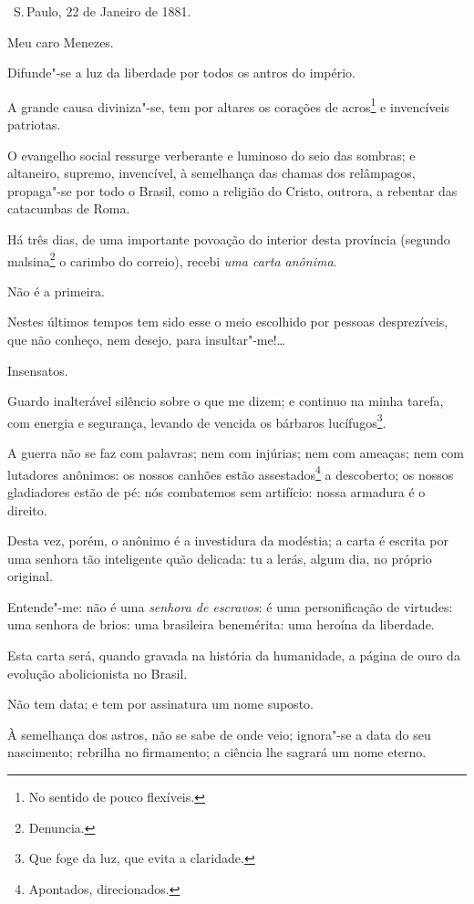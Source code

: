 \hfill\ S.\,Paulo, 22 de Janeiro de 1881.\bigskip

\noindent{}Meu caro Menezes.\smallskip

Difunde"-se a luz da liberdade por todos os antros do império.

A grande causa diviniza"-se, tem por altares os corações de
acros\footnote{No sentido de pouco flexíveis.} e invencíveis
patriotas.

O evangelho social ressurge verberante e luminoso do seio das sombras; e
altaneiro, supremo, invencível, à semelhança das chamas dos relâmpagos,
propaga"-se por todo o Brasil, como a religião do Cristo, outrora, a
rebentar das catacumbas de Roma.

Há três dias, de uma importante povoação do interior desta província
(segundo malsina\footnote{Denuncia.} o carimbo do correio), recebi
\emph{uma carta anônima}.

Não é a primeira.

Nestes últimos tempos tem sido esse o meio escolhido por pessoas
desprezíveis, que não conheço, nem desejo, para insultar"-me!\ldots{}

Insensatos.

Guardo inalterável silêncio sobre o que me dizem; e continuo na minha
tarefa, com energia e segurança, levando de vencida os bárbaros
lucífugos\footnote{Que foge da luz, que evita a claridade.}.

A guerra não se faz com palavras; nem com injúrias; nem com ameaças; nem
com lutadores anônimos: os nossos canhões estão assestados\footnote{
  Apontados, direcionados.} a descoberto; os nossos gladiadores estão de
pé: nós combatemos sem artifício: nossa armadura é o direito.

Desta vez, porém, o anônimo é a investidura da modéstia; a carta é
escrita por uma senhora tão inteligente quão delicada: tu a lerás, algum
dia, no próprio original.

Entende"-me: não é uma \emph{senhora de escravos}: é uma personificação
de virtudes: uma senhora de brios: uma brasileira benemérita: uma
heroína da liberdade.

Esta carta será, quando gravada na história da humanidade, a página de
ouro da evolução abolicionista no Brasil.

Não tem data; e tem por assinatura um nome suposto.

À semelhança dos astros, não se sabe de onde veio; ignora"-se a data do
seu nascimento; rebrilha no firmamento; a ciência lhe sagrará um nome
eterno.

